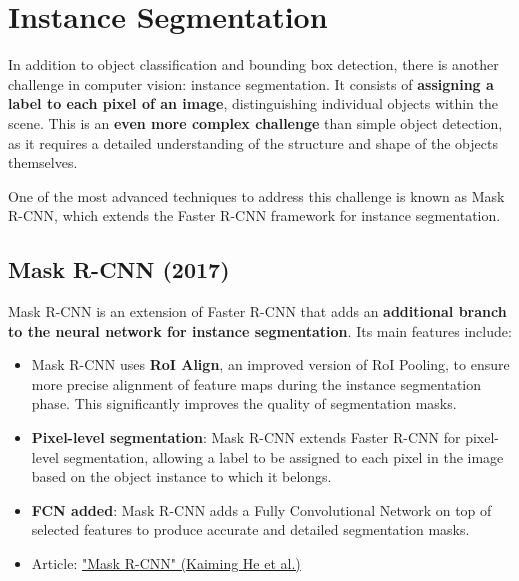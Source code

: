 \section{Instance Segmentation}

In addition to object classification and bounding box detection, there is another challenge in computer vision: instance segmentation. It consists of \textbf{assigning a label to each pixel of an image}, distinguishing individual objects within the scene. This is an \textbf{even more complex challenge} than simple object detection, as it requires a detailed understanding of the structure and shape of the objects themselves.

One of the most advanced techniques to address this challenge is known as Mask R-CNN, which extends the Faster R-CNN framework for instance segmentation. 

\subsection{Mask R-CNN (2017)}

Mask R-CNN is an extension of Faster R-CNN that adds an \textbf{additional branch to the neural network for instance segmentation}. Its main features include:

\begin{itemize}
    \item Mask R-CNN uses \textbf{RoI Align}, an improved version of RoI Pooling, to ensure more precise alignment of feature maps during the instance segmentation phase. This significantly improves the quality of segmentation masks.
    \item \textbf{Pixel-level segmentation}: Mask R-CNN extends Faster R-CNN for pixel-level segmentation, allowing a label to be assigned to each pixel in the image based on the object instance to which it belongs.
    \item \textbf{FCN added}: Mask R-CNN adds a Fully Convolutional Network on top of selected features to produce accurate and detailed segmentation masks.
    \item Article: \href{https://arxiv.org/pdf/1703.06870.pdf}{"Mask R-CNN" (Kaiming He et al.)}
\end{itemize}

